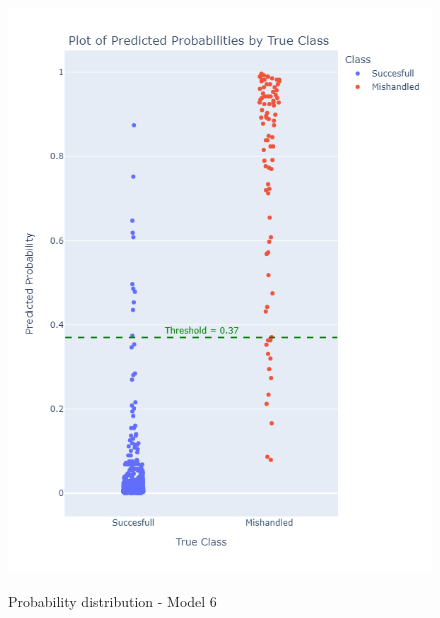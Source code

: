 \documentclass[12pt]{article}
\begin{document}
\begin{figure}
\begin{minipage}[c]{0.4\linewidth}
    \includegraphics[width=1\textwidth]{Probability_distribution_Model 6.png}\\
    \caption{Probability distribution - Model 6}
\end{minipage}%
\hfill
\begin{minipage}[c]{0.4\linewidth}

\end{minipage}
\end{figure}
\end{document}
